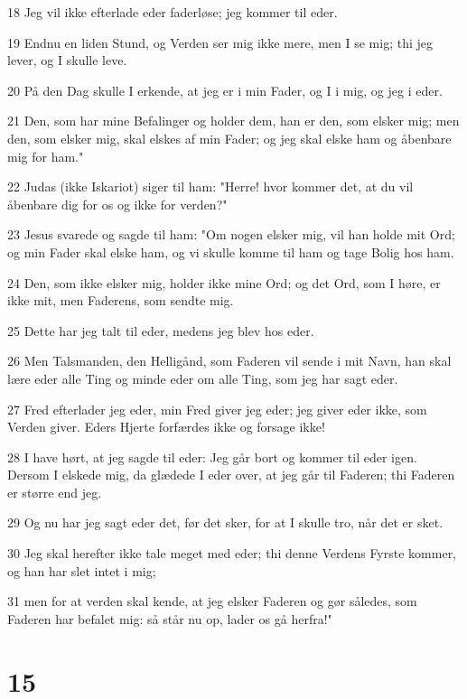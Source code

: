 \par 18 Jeg vil ikke efterlade eder faderløse; jeg kommer til eder.
\par 19 Endnu en liden Stund, og Verden ser mig ikke mere, men I se mig; thi jeg lever, og I skulle leve.
\par 20 På den Dag skulle I erkende, at jeg er i min Fader, og I i mig, og jeg i eder.
\par 21 Den, som har mine Befalinger og holder dem, han er den, som elsker mig; men den, som elsker mig, skal elskes af min Fader; og jeg skal elske ham og åbenbare mig for ham."
\par 22 Judas (ikke Iskariot) siger til ham: "Herre! hvor kommer det, at du vil åbenbare dig for os og ikke for verden?"
\par 23 Jesus svarede og sagde til ham: "Om nogen elsker mig, vil han holde mit Ord; og min Fader skal elske ham, og vi skulle komme til ham og tage Bolig hos ham.
\par 24 Den, som ikke elsker mig, holder ikke mine Ord; og det Ord, som I høre, er ikke mit, men Faderens, som sendte mig.
\par 25 Dette har jeg talt til eder, medens jeg blev hos eder.
\par 26 Men Talsmanden, den Helligånd, som Faderen vil sende i mit Navn, han skal lære eder alle Ting og minde eder om alle Ting, som jeg har sagt eder.
\par 27 Fred efterlader jeg eder, min Fred giver jeg eder; jeg giver eder ikke, som Verden giver. Eders Hjerte forfærdes ikke og forsage ikke!
\par 28 I have hørt, at jeg sagde til eder: Jeg går bort og kommer til eder igen. Dersom I elskede mig, da glædede I eder over, at jeg går til Faderen; thi Faderen er større end jeg.
\par 29 Og nu har jeg sagt eder det, før det sker, for at I skulle tro, når det er sket.
\par 30 Jeg skal herefter ikke tale meget med eder; thi denne Verdens Fyrste kommer, og han har slet intet i mig;
\par 31 men for at verden skal kende, at jeg elsker Faderen og gør således, som Faderen har befalet mig: så står nu op, lader os gå herfra!"

\chapter{15}

